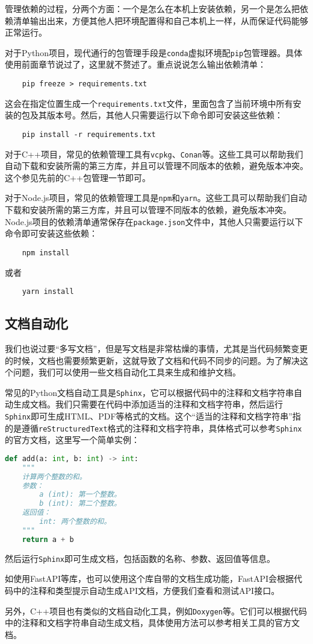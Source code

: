 管理依赖的过程，分两个方面：一个是怎么在本机上安装依赖，另一个是怎么把依赖清单输出出来，方便其他人把环境配置得和自己本机上一样，从而保证代码能够正常运行。

对于Python项目，现代通行的包管理手段是\texttt{conda}虚拟环境配\texttt{pip}包管理器。具体使用前面章节说过了，这里就不赘述了。重点说说怎么输出依赖清单：
\begin{lstlisting}
    pip freeze > requirements.txt
\end{lstlisting}
这会在指定位置生成一个\texttt{requirements.txt}文件，里面包含了当前环境中所有安装的包及其版本号。然后，其他人只需要运行以下命令即可安装这些依赖：
\begin{lstlisting}
    pip install -r requirements.txt
\end{lstlisting}

对于C++项目，常见的依赖管理工具有\texttt{vcpkg}、\texttt{Conan}等。这些工具可以帮助我们自动下载和安装所需的第三方库，并且可以管理不同版本的依赖，避免版本冲突。这个参见先前的C++包管理一节即可。

对于Node.js项目，常见的依赖管理工具是\texttt{npm}和\texttt{yarn}。这些工具可以帮助我们自动下载和安装所需的第三方库，并且可以管理不同版本的依赖，避免版本冲突。Node.js项目的依赖清单通常保存在\texttt{package.json}文件中，其他人只需要运行以下命令即可安装这些依赖：
\begin{lstlisting}
    npm install
\end{lstlisting}
或者
\begin{lstlisting}
    yarn install
\end{lstlisting}

\subsection{文档自动化}

我们也说过要“多写文档”，但是写文档是非常枯燥的事情，尤其是当代码频繁变更的时候，文档也需要频繁更新，这就导致了文档和代码不同步的问题。为了解决这个问题，我们可以使用一些文档自动化工具来生成和维护文档。

常见的Python文档自动工具是\texttt{Sphinx}，它可以根据代码中的注释和文档字符串自动生成文档。我们只需要在代码中添加适当的注释和文档字符串，然后运行\texttt{Sphinx}即可生成HTML、PDF等格式的文档。这个“适当的注释和文档字符串”指的是遵循\texttt{reStructuredText}格式的注释和文档字符串，具体格式可以参考\texttt{Sphinx}的官方文档，这里写一个简单实例：
\begin{lstlisting}[language=Python]
def add(a: int, b: int) -> int:
    """
    计算两个整数的和。
    参数：
        a (int): 第一个整数。
        b (int): 第二个整数。
    返回值：
        int: 两个整数的和。
    """
    return a + b
\end{lstlisting}
然后运行\texttt{Sphinx}即可生成文档，包括函数的名称、参数、返回值等信息。

如使用FastAPI等库，也可以使用这个库自带的文档生成功能，FastAPI会根据代码中的注释和类型提示自动生成API文档，方便我们查看和测试API接口。

另外，C++项目也有类似的文档自动化工具，例如\texttt{Doxygen}等。它们可以根据代码中的注释和文档字符串自动生成文档，具体使用方法可以参考相关工具的官方文档。
